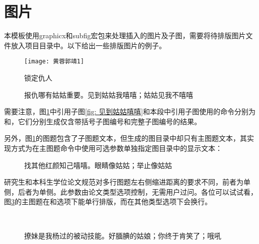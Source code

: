 \documentclass[print, doctor, vlined]{DissertUESTC}
\begin{document}
	\section{图片}
	
	本模板使用graphicx和subfig宏包来处理插入的图片及子图，需要将待排版图片文件放入项目目录中。以下给出一些排版图片的例子。
	
	\begin{figure}[!htb]
		\centering
		\texttt{[image: 黄蓉郭靖1]}
		\caption{锁定仇人}
	\end{figure}
	
	\begin{figure}[!htb]
		\centering
		\hfill
		\caption[报仇哪有姑姑重要]{报仇哪有姑姑重要。见到姑姑我嘻嘻；姑姑见我不嘻嘻} \label{fig: 报仇哪有姑姑重要}
	\end{figure}
	

	需要注意，图\ref{fig: 报仇哪有姑姑重要}中引用子图\ref{fig: 见到姑姑嘻嘻}和本段中引用子图使用的命令分别为和，它们分别生成仅含带括号子图编号和完整子图编号的结果。
	
	另外，图\ref{fig: 报仇哪有姑姑重要}的图题包含了子图题文本，但生成的图目录中却只有主图题文本，其实现方式为在主图题命令中使用可选参数单独指定图目录中的显示文本：
	
	\begin{figure}[!htb]
		\centering
		\hfill
		\subfloat[]{
			\texttt{[image: 程英3]}
			\label{fig: 程英3}
		}
		\caption{找其他红颜知己嘻嘻。眼睛像姑姑；举止像姑姑} \label{fig: 红颜知己}
	\end{figure}
	
	研究生和本科生学位论文规范对多行图题左右侧缩进距离的要求不同，前者为单侧\shad{4em}，后者为单侧\shad{2em}。此参数由论文类型选项控制，无需用户过问。各位可以试试看，图\ref{fig: 被动技能}的主图题在和选项下能单行排版，而在其他类型选项下会换行。

	\begin{figure}[!htb]
		\centering
		\subfloat[]{
			\texttt{[image: 绿萼2]}
			\label{fig: 绿萼2}
		}
		\hfill
		\\
		\caption{撩妹是我杨过的被动技能。好腼腆的姑娘；你终于肯笑了；哦吼} \label{fig: 被动技能}
	\end{figure}
	
\end{document}
